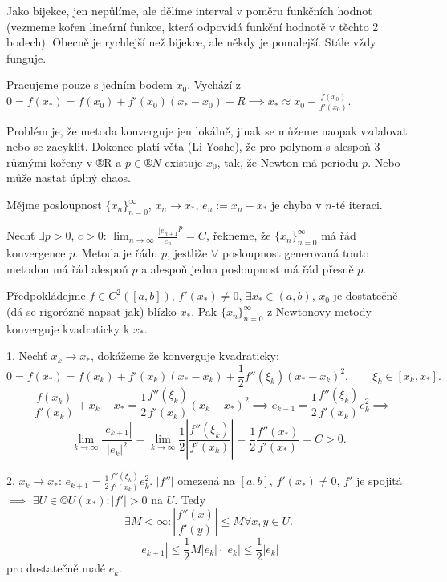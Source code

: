 \documentclass[12pt]{article}					%
\begin{document}
\begin{definice}
	Jako bijekce, jen nepůlíme, ale dělíme interval v poměru funkčních hodnot (vezmeme kořen lineární funkce, která odpovídá funkční hodnotě v těchto 2 bodech). Obecně je rychlejší než bijekce, ale někdy je pomalejší. Stále vždy funguje.
\end{definice}

\begin{definice}
	Pracujeme pouze s jedním bodem $x_0$. Vychází z $0 = f(x_*) = f(x_0) + f'(x_0)(x_* - x_0) + R \implies x_* \approx x_0 - \frac{f(x_0)}{f'(x_0)}$.

	Problém je, že metoda konverguje jen lokálně, jinak se můžeme naopak vzdalovat nebo se zacyklit. Dokonce platí věta (Li-Yoshe), že pro polynom s alespoň 3 různými kořeny v ®R a $p \in ®N$ existuje $x_0$, tak, že Newton má periodu $p$. Nebo může nastat úplný chaos.
\end{definice}

\begin{definice}
	Mějme posloupnost $\{x_n\}_{n=0}^∞$, $x_n \rightarrow x_*$, $e_n := x_n - x_*$ je chyba v $n$-té iteraci.

	Nechť $\exists p > 0$, $c > 0$: $\lim_{n \rightarrow ∞} \frac{|e_{n+1}}{e_n}^p = C$, řekneme, že $\{x_n\}_{n=0}^∞$ má řád konvergence $p$. Metoda je řádu $p$, jestliže $\forall$ posloupnost generovaná touto metodou má řád alespoň $p$ a alespoň jedna posloupnost má řád přesně $p$.
\end{definice}

\begin{veta}
	Předpokládejme $f \in C^2([a, b])$, $f'(x_*) ≠ 0$, $\exists x_* \in (a, b)$, $x_0$ je dostatečně (dá se rigorózně napsat jak) blízko $x_*$. Pak $\{x_n\}_{n=0}^∞$ z Newtonovy metody konverguje kvadraticky k $x_*$.

	\begin{dukazin}
		1. Nechť $x_k \rightarrow x_*$, dokážeme že konverguje kvadraticky:
		$$ 0 = f(x_*) = f(x_k) + f'(x_k)(x_* - x_k) + \frac{1}{2}f''(\xi_k)(x_* - x_k)^2, \qquad \xi_k \in [x_k, x_*]. $$
		$$ - \frac{f(x_k)}{f'(x_k)} + x_k - x_* = \frac{1}{2} \frac{f''(\xi_k)}{f'(x_k)} (x_k - x_*)^2 \implies e_{k+1} = \frac{1}{2} \frac{f''(\xi_k)}{f'(x_k)} e_k^2 \implies $$
		$$ \lim_{k \rightarrow ∞} \frac{|e_{k+1}|}{|e_k|^2} = \lim_{k \rightarrow ∞} \frac{1}{2} |\frac{f''(\xi_k)}{f'(x_k)}| = \frac{1}{2} \frac{f''(x_*)}{f'(x_*)} = C > 0. $$

		2. $x_k \rightarrow x_*$: $e_{k+1} = \frac{1}{2} \frac{f''(\xi_k)}{f'(x_k)} e^2_k$. $|f''|$ omezená na $[a, b]$, $f'(x_*) ≠ 0$, $f'$ je spojitá $\implies$ $\exists U \in ©U(x_*): |f'| > 0$ na $U$. Tedy 
		$$ \exists M < ∞: |\frac{f''(x)}{f'(y)}| ≤ M \forall x, y \in U. $$
		$$ |e_{k+1}| ≤ \frac{1}{2} M |e_k|·|e_k| ≤ \frac{1}{2}|e_k| $$
		pro dostatečně malé $e_k$.
	\end{dukazin}
\end{veta}
\end{document}
